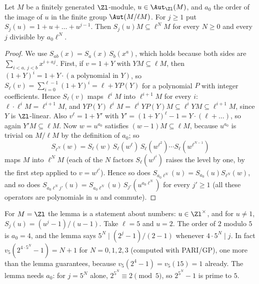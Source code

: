 \begin{lemma}\label{lem:cohomology:geometric-sums}
Let $M$ be a finitely generated $\Zl$-module, $u\in\Aut_{\Zl}(M)$, and $a_0$ the order of the image of $u$ in the finite group $\Aut(M/\ell M)$. For $j\ge1$ put
$S_j(u)=1+u+\dots+u^{j-1}$. Then $S_j(u)M\subseteq\ell^NM$ for every $N\ge0$ and every $j$ divisible by $a_0\ell^N$.
\end{lemma}

\begin{proof}
We use $S_{ab}(x)=S_a(x)\,S_b(x^a)$, which holds because both sides are $\sum_{i<a,\,j<b}x^{i+aj}$. First, if $v=1+Y$ with $YM\subseteq\ell M$, then
$(1+Y)^i=1+Y\cdot(\text{a polynomial in }Y)$, so $S_\ell(v)=\sum_{i=0}^{\ell-1}(1+Y)^i=\ell+YP(Y)$ for a polynomial $P$ with integer coefficients. Hence $S_\ell(v)$ maps
$\ell^iM$ into $\ell^{i+1}M$ for every $i$: $\ell\cdot\ell^iM=\ell^{i+1}M$, and $YP(Y)\ell^iM=\ell^iYP(Y)M\subseteq\ell^iYM\subseteq\ell^{i+1}M$, since $Y$ is $\Zl$-linear. Also
$v^\ell=1+Y'$ with $Y'=(1+Y)^\ell-1=Y\cdot(\ell+\dots)$, so again $Y'M\subseteq\ell M$. Now $w=u^{a_0}$ satisfies $(w-1)M\subseteq\ell M$, because $u^{a_0}$ is trivial on
$M/\ell M$ by the definition of $a_0$; so
\[
S_{\ell^N}(w)=S_\ell(w)\,S_\ell(w^\ell)\,S_\ell(w^{\ell^2})\cdots S_\ell(w^{\ell^{N-1}})
\]
maps $M$ into $\ell^NM$ (each of the $N$ factors $S_\ell(w^{\ell^i})$ raises the level by one, by the first step applied to $v=w^{\ell^i}$). Hence so does
$S_{a_0\ell^N}(u)=S_{a_0}(u)S_{\ell^N}(w)$, and so does $S_{a_0\ell^Nj'}(u)=S_{a_0\ell^N}(u)\,S_{j'}(u^{a_0\ell^N})$ for every $j'\ge1$ (all these operators are polynomials in $u$
and commute).
\end{proof}

For $M=\Zl$ the lemma is a statement about numbers: $u\in\Zl^\times$, and for $u\ne1$, $S_j(u)=(u^j-1)/(u-1)$. Take $\ell=5$ and $u=2$. The order of $2$ modulo $5$ is
$a_0=4$, and the lemma says $5^N\mid(2^j-1)/(2-1)$ whenever $4\cdot5^N\mid j$. In fact $v_5(2^{4\cdot5^N}-1)=N+1$ for $N=0,1,2,3$ (computed with PARI/GP), one more than the lemma
guarantees, because $v_5(2^4-1)=v_5(15)=1$ already. The lemma needs $a_0$: for $j=5^N$ alone, $2^{5^N}\equiv2\pmod5$, so $2^{5^N}-1$ is prime to $5$.

